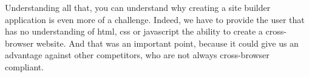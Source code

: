 Understanding all that, you can understand why creating a site builder application is even more of a challenge. Indeed, we have to provide the user that has no understanding of html, css or javascript the ability to create a cross-browser website. And that was an important point, because it could give us an advantage against other competitors, who are not always cross-browser compliant.

